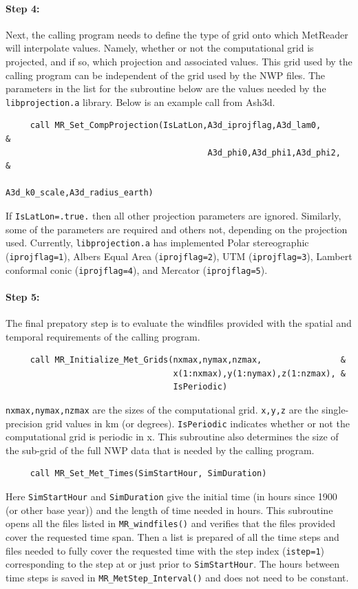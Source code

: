 \documentclass[11pt]{article}   %
\begin{document}
\paragraph{Step 4:} Next, the calling program needs to define the type of grid onto which MetReader 
will interpolate values.  Namely, whether or not the computational grid is projected, and if so,
which projection and associated values.  This grid used by the calling program can be independent
of the grid used by the NWP files.  The parameters in the list for the subroutine below are the values
needed by the \texttt{libprojection.a} library.  Below is an example call from Ash3d.
\begin{verbatim}
     call MR_Set_CompProjection(IsLatLon,A3d_iprojflag,A3d_lam0,           &
                                         A3d_phi0,A3d_phi1,A3d_phi2,       &
                                         A3d_k0_scale,A3d_radius_earth)
\end{verbatim}
If \texttt{IsLatLon=.true.} then all other projection parameters are ignored.  Similarly,
some of the parameters are required and others not, depending on the projection used.
Currently, \texttt{libprojection.a} has implemented
Polar stereographic (\texttt{iprojflag=1}),
Albers Equal Area (\texttt{iprojflag=2}),
UTM (\texttt{iprojflag=3}),
Lambert conformal conic (\texttt{iprojflag=4}),
and Mercator (\texttt{iprojflag=5}).

\paragraph{Step 5:} The final prepatory step is to evaluate the windfiles provided
with the spatial and temporal requirements of the calling program.
\begin{verbatim}
     call MR_Initialize_Met_Grids(nxmax,nymax,nzmax,                &
                                  x(1:nxmax),y(1:nymax),z(1:nzmax), &
                                  IsPeriodic)
\end{verbatim}
\texttt{nxmax,nymax,nzmax} are the sizes of the computational grid. \texttt{x,y,z} are the
single-precision grid values in km (or degrees).  \texttt{IsPeriodic} indicates whether or
not the computational grid is periodic in x.  This subroutine also determines the size
of the sub-grid of the full NWP data that is needed by the calling program.
\begin{verbatim}
     call MR_Set_Met_Times(SimStartHour, SimDuration)
\end{verbatim}
Here \texttt{SimStartHour} and \texttt{SimDuration} give the initial time (in hours since 1900 (or
other base year)) and the length of time needed in hours.  This subroutine opens all the
files listed in \texttt{MR\_windfiles()} and verifies that the files provided cover the requested
time span.  Then a list is prepared of all the time steps and files needed to fully cover the 
requested time with the step index (\texttt{istep=1}) corresponding to the step at or
just prior to \texttt{SimStartHour}.
The hours between time steps is saved in \texttt{MR\_MetStep\_Interval()} and does not need to
be constant.
\end{document}
